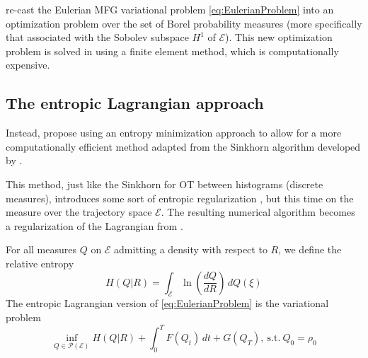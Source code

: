 \documentclass{article}
\newcommand{\calP}{\mathcal{P}}
\newcommand{\suchthat}{\mathrm{s.t.}}
\begin{document}
    \textcite{benamou:hal-01295299,benamou2015lagrangian} re-cast the Eulerian MFG variational problem \eqref{eq:EulerianProblem} into an optimization problem over the set of Borel probability measures (more specifically that associated with the Sobolev subspace $H^1$ of $\mathscr{E}$). This new optimization problem is solved in \cite{benamou:hal-01295299} using a finite element method, which is computationally expensive.
    
    
    
    
    \subsection{The entropic Lagrangian approach}
    
    Instead, \textcite{benamou2018entropy} propose using an entropy minimization approach to allow for a more computationally efficient method adapted from the Sinkhorn algorithm \cite{cuturi2013sinkhorn} developed by \citeauthor{cuturi2013sinkhorn}.
    
    This method, just like the Sinkhorn for OT between histograms (discrete measures), introduces some sort of entropic regularization \cite{benamou2018entropy}, but this time on the measure over the trajectory space $\mathscr{E}$. The resulting numerical algorithm becomes a regularization of the Lagrangian from \cite{achdou:hal-01456506}.
    
    For all measures $Q$ on $\mathscr{E}$ admitting a density with respect to $R$, we define the relative entropy
    \begin{equation}\label{eq:VariationalEntropy}
   	H(Q | R) = \int_\mathscr{E} \ln\left(\frac{dQ}{dR}\right)\,dQ(\xi)
    \end{equation}
    The entropic Lagrangian version of \eqref{eq:EulerianProblem} is the variational problem
    \begin{equation}\label{eq:EntropyLagrangianPb}
    \inf_{Q\in\calP(\mathscr{E})}
    H(Q|R) + \int_0^T F(Q_t)\,dt + G(Q_T),\
    \suchthat\ Q_0 = \rho_0
    \end{equation}
    
\end{document}
